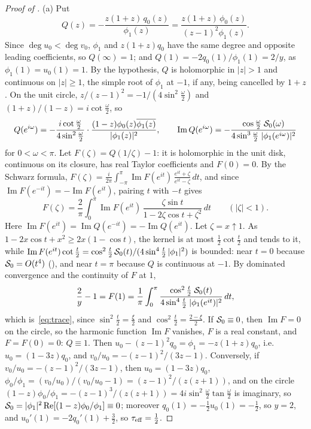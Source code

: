 \documentclass[11pt]{article}
\theoremstyle{definition}
\theoremstyle{remark}
\newcommand{\Rea}{\operatorname{Re}}
\newcommand{\Ima}{\operatorname{Im}}
\newcommand{\teff}{\tau_{\rm eff}}
\begin{document}
\begin{proof}[Proof of ]
(a) Put
\[
Q(z)=-\frac{z(1+z)\,q_0(z)}{\phi_1(z)}=\frac{z(1+z)\,\phi_0(z)}{(z-1)^2\phi_1(z)} .
\]
Since \(\deg u_0<\deg v_0\), \(\phi_1\) and \(z(1+z)q_0\) have the same degree and opposite leading coefficients, so
\(Q(\infty)=1\); and \(Q(1)=-2q_0(1)/\phi_1(1)=2/y\), as \(\phi_1(1)=u_0(1)=1\).  By the hypothesis, \(Q\) is holomorphic in
\(|z|>1\) and continuous on \(|z|\ge1\), the simple root of \(\phi_1\) at \(-1\), if any, being cancelled by \(1+z\).  On
the unit circle, \(z/(z-1)^2=-1/(4\sin^2\frac\omega2)\) and \((1+z)/(1-z)=i\cot\frac\omega2\), so
\[
Q(e^{i\omega})=-\frac{i\cot\frac\omega2}{4\sin^2\frac\omega2}\cdot\frac{(1-z)\phi_0(z)\overline{\phi_1(z)}}{|\phi_1(z)|^2},\qquad
\Ima Q(e^{i\omega})=-\frac{\cos\frac\omega2\;\Szero(\omega)}{4\sin^3\frac\omega2\;|\phi_1(e^{i\omega})|^2}
\]
for \(0<\omega<\pi\).  Let \(F(\zeta)=Q(1/\zeta)-1\): it is holomorphic in the unit disk, continuous on its closure, has
real Taylor coefficients and \(F(0)=0\).  By the Schwarz formula,
\(F(\zeta)=\frac i{2\pi}\int_{-\pi}^{\pi}\Ima F(e^{it})\,\frac{e^{it}+\zeta}{e^{it}-\zeta}\,dt\), and since \(\Ima F(e^{-it})=-\Ima F(e^{it})\), pairing \(t\) with \(-t\) gives
\[
F(\zeta)=\frac2\pi\int_0^\pi\Ima F(e^{it})\,\frac{\zeta\sin t}{1-2\zeta\cos t+\zeta^2}\,dt\qquad(|\zeta|<1).
\]
Here \(\Ima F(e^{it})=\Ima Q(e^{-it})=-\Ima Q(e^{it})\).  Let \(\zeta=x\uparrow1\).  As \(1-2x\cos t+x^2\ge2x(1-\cos t)\), the kernel is at
most \(\frac1{2}\cot\frac t2\) and tends to it, while \(\Ima F(e^{it})\cot\frac t2=\cos^2\frac t2\,\Szero(t)/(4\sin^4\frac t2\,|\phi_1|^2)\) is bounded: near
\(t=0\) because \(\mathcal S_0=O(t^4)\) (), and near \(t=\pi\) because \(Q\) is continuous at \(-1\).  By dominated
convergence and the continuity of \(F\) at \(1\),
\[
\frac2y-1=F(1)=\frac1\pi\int_0^\pi\frac{\cos^2\frac t2\;\mathcal S_0(t)}{4\sin^4\frac t2\;|\phi_1(e^{it})|^2}\,dt ,
\]
which is~\eqref{eq:trace}, since \(\sin^2\frac t2=\frac\xi2\) and \(\cos^2\frac t2=\frac{2-\xi}2\).  If \(\mathcal S_0\equiv0\), then \(\Ima F=0\) on the circle, so the
harmonic function \(\Ima F\) vanishes, \(F\) is a real constant, and \(F=F(0)=0\): \(Q\equiv1\).  Then
\(u_0-(z-1)^2q_0=\phi_1=-z(1+z)q_0\), i.e.\ \(u_0=(1-3z)q_0\), and \(v_0/u_0=-(z-1)^2/(3z-1)\).  Conversely, if
\(v_0/u_0=-(z-1)^2/(3z-1)\), then \(u_0=(1-3z)q_0\), \(\phi_0/\phi_1=(v_0/u_0)/(v_0/u_0-1)=(z-1)^2/(z(z+1))\), and on the circle
\((1-z)\phi_0/\phi_1=-(z-1)^3/(z(z+1))=4i\sin^2\frac\omega2\tan\frac\omega2\) is imaginary, so \(\Szero=|\phi_1|^2\Rea[(1-z)\phi_0/\phi_1]\equiv0\);
moreover \(q_0(1)=-\frac12u_0(1)=-\frac12\), so \(y=2\), and \(u_0'(1)=-2q_0'(1)+\frac32\), so \(\teff=\frac12\).


\end{proof}
\end{document}
